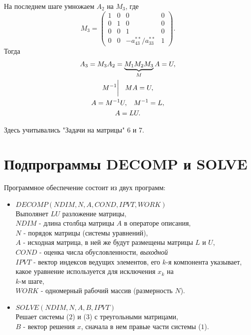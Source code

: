 \documentclass[a4paper,11pt]{article}
\begin{document}
На последнем шаге умножаем $A_2$ на $M_3$, где
\begin{equation*}
  M_3 =
  \begin{pmatrix}
    1 & 0 & 0 & 0 \\
    0 & 1 & 0 & 0 \\
    0 & 0 & 1 & 0 \\
    0 & 0 & -a_{43}^{**}/a_{33}^{**} & 1
  \end{pmatrix}.
\end{equation*}
Тогда
\begin{gather*}
  A_3 = M_3A_2 = \underbrace{M_1M_2M_3}_{M}A = U, \\
  M^{-1} \bigg| \hspace{3mm} MA=U, \\
  A = M^{-1}U, \hspace{3mm} M^{-1} = L, \\
  A = LU.
\end{gather*}
\begin{flushright}
  \footnotesize Здесь учитывались "Задачи на матрицы" 6 и 7.
\end{flushright}

\section{Подпрограммы DECOMP и SOLVE}
Программное обеспечение состоит из двух программ:
\begin{itemize}
  \item $DECOMP(NDIM, N, A, COND, IPVT, WORK)$ \\
    Выполянет $LU$ разложение матрицы, \vspace{2mm} \\
    $NDIM$ - длина столбца матрицы $A$ в операторе описания, \\
    $N$ - порядок матрицы (системы уравнений), \\
    $A$ - исходная матрица, в ней же будут размещены матрицы $L$ и $U$, \\
    $COND$ - оценка числа обусловленности, \textit{выходной}\\
    $IPVT$ - вектор индексов ведущих элементов, его $k$-я компонента указывает, какое уравнение используется для исключения $x_k$ на \\ $k$-м шаге, \\
    $WORK$ - одномерный рабочий массив (размерность $N$).
  \item $SOLVE(NDIM, N, A, B, IPVT)$ \\
    Решает системы ($2$) и ($3$) с треугольными матрицами, \\
    $B$ - вектор решения $x$, сначала в нем правые части системы ($1$).
\end{itemize}
\end{document}
